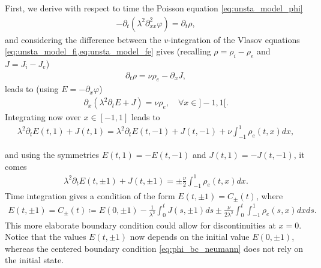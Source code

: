 \documentclass{article}
\numberwithin{equation}{section}
\newcommand{\R}{\mathbb{R}}
\begin{document}
First, we derive with respect to time the Poisson equation \cref{eq:unsta_model_phi}
\begin{align*}
	- \partial_t (\lambda^2\partial_{xx}^2 \varphi) = \partial_t \rho, 	
\end{align*}
and considering the difference between the $v$-integration of the Vlasov equations \cref{eq:unsta_model_fi,eq:unsta_model_fe} gives (recalling $\rho=\rho_i-\rho_e$ and $J=J_i-J_e$) 
\begin{align*}
	\partial_t \rho = \nu \rho_e - \partial_x J,
\end{align*}
leads to (using $E=-\partial_x \varphi$) 
\begin{align*}
	\partial_x (\lambda^2\partial_t E + J) = \nu \rho_e, \quad \forall x\in ]-1, 1[. 	
\end{align*}
Integrating now over $x\in[-1, 1]$ leads to 
\begin{align}\label{eq:ampere_integ}
	\lambda^2\partial_t E(t, 1) + J(t, 1) = \lambda^2\partial_t E(t, -1) + J(t, -1) +\nu \int_{-1}^1 \rho_e (t, x) dx,  
\end{align}

and using the symmetries $E(t,1)=-E(t, -1)$ and  $J(t,1)=-J(t, -1)$, it comes 
\begin{align}\label{eq:ampere_bc}
	\lambda^2\partial_t E(t, \pm 1) + J(t, \pm 1)  = \pm \frac{\nu}{2} \int_{-1}^1 \rho_e (t, x)dx.
\end{align}
Time integration gives a condition of the form $E(t,\pm 1) = C_{\pm}(t)$, where %
\begin{align}\label{eq:ampere_bc_phi}
	E(t,\pm 1) = C_{\pm} (t) \coloneqq E(0,\pm1) - \frac{1}{\lambda^2} \int_0^t J (s, \pm1) ds \pm \frac{\nu}{2 \lambda^2}\int_0^t  \int_{-1}^1 \rho_e (s, x) dx ds. 
\end{align}
This more elaborate boundary condition could allow for discontinuities at $x=0$. Notice that the values $E(t,\pm 1)$ now depends on the initial value $E(0,\pm1)$, whereas the centered boundary condition \cref{eq:phi_bc_neumann} does not rely on the initial state. 
\end{document}
